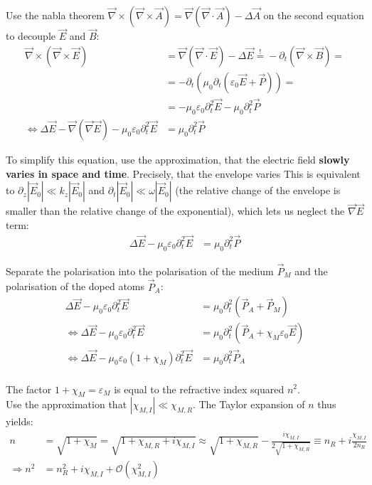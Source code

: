 \documentclass{article}
\newcommand{\lr}[1]{\left(#1\right)}
\begin{document}
{	Use the nabla theorem $\vec{\nabla} \times (\vec{\nabla} \times \vec{A}) = \vec{\nabla} (\vec{\nabla} \cdot \vec{A}) - \Delta \vec{A}$ on the second equation to decouple $\vec{E}$ and $\vec{B}$:
		\begin{align*}
			\vec{\nabla} \times (\vec{\nabla} \times \vec{E}) &= \vec{\nabla} (\vec{\nabla} \cdot \vec{E}) - \Delta \vec{E} \stackrel{!}{=} -\partial_t (\vec{\nabla} \times \vec{B}) = \\
			&= -\partial_t(\mu_0\partial_t(\varepsilon_0\vec{E} + \vec{P})) = \\
			&= -\mu_0\varepsilon_0 \partial_t^2 \vec{E} - \mu_0 \partial_t^2 \vec{P} \\
			\Leftrightarrow \Delta \vec{E} - \vec{\nabla} (\vec{\nabla} \vec{E}) - \mu_0\varepsilon_0 \partial_t^2 \vec{E} &= \mu_0 \partial_t^2 \vec{P}
		\end{align*}
	
	To simplify this equation, use the approximation, that the electric field \textbf{slowly varies in space and time}. Precisely, that the envelope varies  This is equivalent to $\partial_z |\vec{E}_0| \ll k_z |\vec{E}_0|$ and $\partial_t |\vec{E}_0| \ll \omega |\vec{E}_0|$ \textcolor{gruen}{(the relative change of the envelope is smaller than the relative change of the exponential)}, which lets us neglect the $\vec{\nabla}\vec{E}$ term:
		\begin{align*}
			\Delta \vec{E} - \mu_0\varepsilon_0 \partial_t^2 \vec{E} &= \mu_0 \partial_t^2 \vec{P}
		\end{align*}

	Separate the polarisation into the polarisation of the medium $\vec{P}_M$ and the polarisation of the doped atoms $\vec{P}_A$:
		\begin{align*}
			\Delta \vec{E} - \mu_0\varepsilon_0 \partial_t^2 \vec{E} &= \mu_0 \partial_t^2 (\vec{P}_A + \vec{P}_M) \\
			\Leftrightarrow \Delta \vec{E} - \mu_0\varepsilon_0 \partial_t^2 \vec{E} &= \mu_0 \partial_t^2 (\vec{P}_A + \chi_M\varepsilon_0\vec{E}) \\
			\Leftrightarrow \Delta \vec{E} -  \mu_0\varepsilon_0 \lr{ 1 + \chi_M }\partial_t^2 \vec{E} &= \mu_0 \partial_t^2 \vec{P}_A \\
		\end{align*}

	The factor $1 + \chi_M = \varepsilon_M$ is equal to the refractive index squared $n^2$.\\
	Use the approximation that $|\chi_{M,I}| \ll \chi_{M,R}$. The Taylor expansion of $n$ thus yields:
		\begin{align*}
			n &= \sqrt{ 1 + \chi_M } = \sqrt{ 1 + \chi_{M,R} + i\chi_{M,I}} \approx \sqrt{ 1 + \chi_{M,R} } - \frac{i \chi_{M,I}}{2\sqrt{ 1 + \chi_{M,R}}} \equiv n_R + i\frac{\chi_{M,I}}{2n_R} \\
			\Rightarrow n^2 &= n_R^2 + i\chi_{M,I} + \mathcal{O}(\chi_{M,I}^2)
		\end{align*}
	

}
\end{document}
